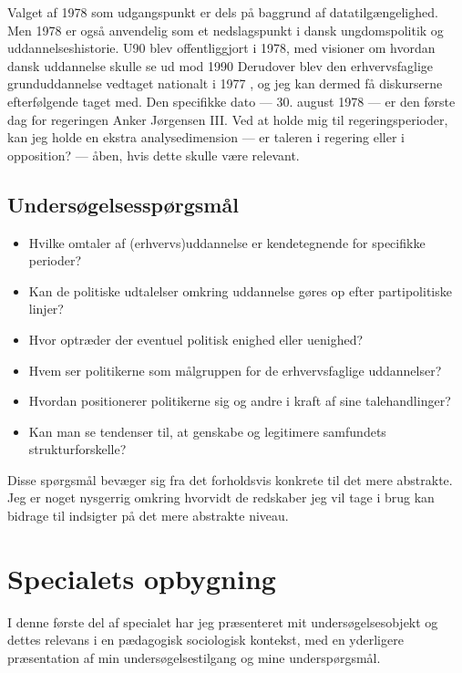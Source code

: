Valget af 1978 som udgangspunkt er dels på baggrund af datatilgængelighed.
Men 1978 er også anvendelig som et nedslagspunkt i dansk ungdomspolitik og uddannelseshistorie.
U90 blev offentliggjort i 1978, med visioner om hvordan dansk uddannelse skulle se ud mod 1990 \autocite{undervisningsministeriet90SamletUddannelsesplanlaegning1978}
Derudover blev den erhvervsfaglige grunduddannelse vedtaget nationalt i 1977 \autocite{thewikipediavolunteersEFG2019}, og jeg kan dermed få diskurserne efterfølgende taget med.
Den specifikke dato — 30. august 1978 — er den første dag for regeringen Anker Jørgensen III.
Ved at holde mig til regeringsperioder, kan jeg holde en ekstra analysedimension — er taleren i regering eller i opposition? — åben, hvis dette skulle være relevant.

\section{Undersøgelsesspørgsmål}\label{seq:resqs}

\begin{itemize}
  \item
    Hvilke omtaler af (erhvervs)uddannelse er kendetegnende for specifikke perioder?
  \item
    Kan de politiske udtalelser omkring uddannelse gøres op efter partipolitiske linjer?
  \item
    Hvor optræder der eventuel politisk enighed eller uenighed?
  \item
    Hvem ser politikerne som målgruppen for de erhvervsfaglige uddannelser?
  \item
    Hvordan positionerer politikerne sig og andre i kraft af sine talehandlinger?
  \item
    Kan man se tendenser til, at genskabe og legitimere samfundets strukturforskelle?
\end{itemize}

Disse spørgsmål bevæger sig fra det forholdsvis konkrete til det mere abstrakte.
Jeg er noget nysgerrig omkring hvorvidt de redskaber jeg vil tage i brug kan bidrage til indsigter på det mere abstrakte niveau.

\chapter{Specialets opbygning}
I denne første del af specialet har jeg præsenteret mit undersøgelsesobjekt og dettes relevans i en pædagogisk sociologisk kontekst, med en yderligere præsentation af min undersøgelsestilgang og mine underspørgsmål.

